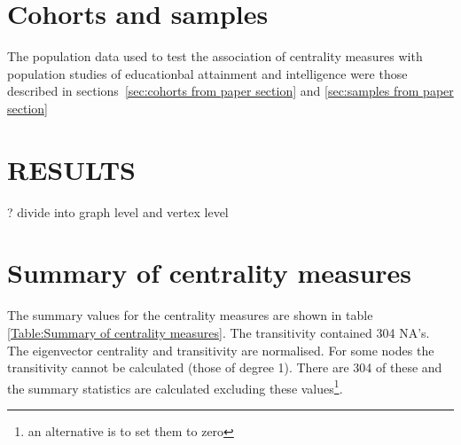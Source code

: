 \section{Cohorts and samples}
\label{Centrality:cohorts and samples}
The population data used to test the association of centrality measures with population studies of educationbal attainment and intelligence were those described in sections~\ref{sec:cohorts from paper section} and \ref{sec:samples from paper section}












\section{RESULTS}
? divide into graph level and vertex level

\section{Summary of centrality measures}

The summary values for the centrality measures are shown in table \ref{Table:Summary of centrality measures}. The transitivity contained 304 NA's.
The eigenvector centrality and transitivity are normalised. For some nodes the transitivity cannot be calculated (those of degree 1). There are 304 of these and the summary statistics are calculated excluding these values\footnote{an alternative is to set them to zero}. 

